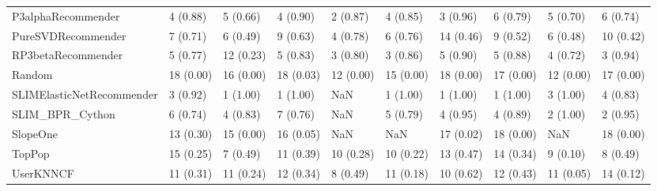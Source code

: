 \begin{tabular}{llllllllll}
                 P3alphaRecommender &                 4 (0.88) &    5 (0.66) &      4 (0.90) &     2 (0.87) &             4 (0.85) &            3 (0.96) &          6 (0.79) &           5 (0.70) &          6 (0.74) \\
                 PureSVDRecommender &                 7 (0.71) &    6 (0.49) &      9 (0.63) &     4 (0.78) &             6 (0.76) &           14 (0.46) &          9 (0.52) &           6 (0.48) &         10 (0.42) \\
                 RP3betaRecommender &                 5 (0.77) &   12 (0.23) &      5 (0.83) &     3 (0.80) &             3 (0.86) &            5 (0.90) &          5 (0.88) &           4 (0.72) &          3 (0.94) \\
                             Random &                18 (0.00) &   16 (0.00) &     18 (0.03) &    12 (0.00) &            15 (0.00) &           18 (0.00) &         17 (0.00) &          12 (0.00) &         17 (0.00) \\
          SLIMElasticNetRecommender &                 3 (0.92) &    1 (1.00) &      1 (1.00) &          NaN &             1 (1.00) &            1 (1.00) &          1 (1.00) &           3 (1.00) &          4 (0.83) \\
                    SLIM\_BPR\_Cython &                 6 (0.74) &    4 (0.83) &      7 (0.76) &          NaN &             5 (0.79) &            4 (0.95) &          4 (0.89) &           2 (1.00) &          2 (0.95) \\
                           SlopeOne &                13 (0.30) &   15 (0.00) &     16 (0.05) &          NaN &                  NaN &           17 (0.02) &         18 (0.00) &                NaN &         18 (0.00) \\
                             TopPop &                15 (0.25) &    7 (0.49) &     11 (0.39) &    10 (0.28) &            10 (0.22) &           13 (0.47) &         14 (0.34) &           9 (0.10) &          8 (0.49) \\
                          UserKNNCF &                11 (0.31) &   11 (0.24) &     12 (0.34) &     8 (0.49) &            11 (0.18) &           10 (0.62) &         12 (0.43) &          11 (0.05) &         14 (0.12) \\
\bottomrule
\end{tabular}
